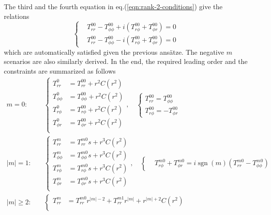 \documentclass[a4paper, 11pt]{article}
\DeclareMathOperator{\sgn}{sgn}
\begin{document}
The third and the fourth equation in eq.(\ref{eqn:rank-2-conditions}) give the relations
\[
\left\{\begin{aligned}
    &T_{rr}^{00} - T_{\phi\phi}^{00} + i \left(T_{r\phi}^{00} + T_{\phi r}^{00}\right) = 0 \\ 
    &T_{rr}^{00} - T_{\phi\phi}^{00} - i \left(T_{r\phi}^{00} + T_{\phi r}^{00}\right) = 0
\end{aligned}\right.
\]
which are automatically satisfied given the previous ansätze. The negative $m$ scenarios are also similarly derived. In the end, the required leading order and the constraints are summarized as follows
\begin{equation}
\begin{aligned}
    m = 0 :& \quad \left\{\begin{aligned}
        T_{rr}^0 &= T_{rr}^{00} + r^2 C(r^2) \\ 
        T_{\phi\phi}^0 &= T_{\phi\phi}^{00} + r^2 C(r^2) \\ 
        T_{r\phi}^0 &= T_{r\phi}^{00} + r^2 C(r^2) \\ 
        T_{\phi r}^0 &= T_{\phi r}^{00} + r^2 C(r^2) \\ 
    \end{aligned}\right.,\quad 
    \left\{\begin{aligned}
        T_{rr}^{00} = T_{\phi\phi}^{00} \\ 
        T_{r\phi}^{00} = -T_{\phi r}^{00}
    \end{aligned}\right. \\ 
    |m| = 1 :& \quad \left\{\begin{aligned}
        T_{rr}^m &= T_{rr}^{m0} s + r^3 C(r^2) \\
        T_{\phi\phi}^m &= T_{\phi\phi}^{m0} s + r^{3} C(r^2) \\
        T_{r\phi}^m &= T_{r\phi}^{m0} s + r^{3} C(r^2) \\
        T_{\phi r}^m &= T_{\phi r}^{m0} s + r^{3} C(r^2) \\
    \end{aligned}\right.,\quad \left\{\begin{aligned}
        &T_{r\phi}^{m0} + T_{\phi r}^{m0} = i\sgn(m) \left(T_{rr}^{m0} - T_{\phi\phi}^{m0}\right)
    \end{aligned}\right. \\
    |m| \geq 2 :& \quad \left\{\begin{aligned}
        T_{rr}^m &= T_{rr}^{m0} r^{|m|-2} + T_{rr}^{m1} r^{|m|} + r^{|m|+2} C(r^2) \\

\end{aligned}
\end{aligned}
\end{equation}
\end{document}
